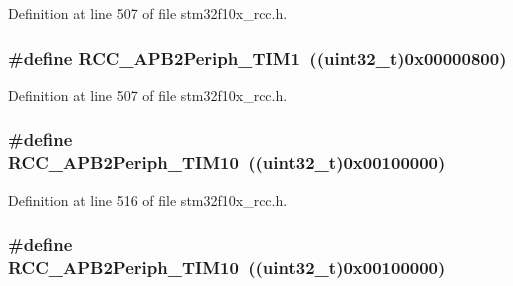 Definition at line 507 of file stm32f10x\+\_\+rcc.\+h.

\subsubsection[{\texorpdfstring{R\+C\+C\+\_\+\+A\+P\+B2\+Periph\+\_\+\+T\+I\+M1}{RCC_APB2Periph_TIM1}}]{\setlength{\rightskip}{0pt plus 5cm}\#define R\+C\+C\+\_\+\+A\+P\+B2\+Periph\+\_\+\+T\+I\+M1~(({\bf uint32\+\_\+t})0x00000800)}\hypertarget{group___a_p_b2__peripheral_ga0d9babf212897db0b3aa852f8a71160b}{}\label{group___a_p_b2__peripheral_ga0d9babf212897db0b3aa852f8a71160b}


Definition at line 507 of file stm32f10x\+\_\+rcc.\+h.

\subsubsection[{\texorpdfstring{R\+C\+C\+\_\+\+A\+P\+B2\+Periph\+\_\+\+T\+I\+M10}{RCC_APB2Periph_TIM10}}]{\setlength{\rightskip}{0pt plus 5cm}\#define R\+C\+C\+\_\+\+A\+P\+B2\+Periph\+\_\+\+T\+I\+M10~(({\bf uint32\+\_\+t})0x00100000)}\hypertarget{group___a_p_b2__peripheral_ga75069120ecbe86920b39c2b75c909438}{}\label{group___a_p_b2__peripheral_ga75069120ecbe86920b39c2b75c909438}


Definition at line 516 of file stm32f10x\+\_\+rcc.\+h.

\subsubsection[{\texorpdfstring{R\+C\+C\+\_\+\+A\+P\+B2\+Periph\+\_\+\+T\+I\+M10}{RCC_APB2Periph_TIM10}}]{\setlength{\rightskip}{0pt plus 5cm}\#define R\+C\+C\+\_\+\+A\+P\+B2\+Periph\+\_\+\+T\+I\+M10~(({\bf uint32\+\_\+t})0x00100000)}\hypertarget{group___a_p_b2__peripheral_ga75069120ecbe86920b39c2b75c909438}{}\label{group___a_p_b2__peripheral_ga75069120ecbe86920b39c2b75c909438}


